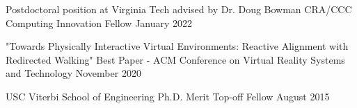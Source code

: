 
\begin{cventries}
  \cventry
    {Postdoctoral position at Virginia Tech advised by Dr. Doug Bowman} %
    {CRA/CCC Computing Innovation Fellow} %
    {January 2022} %
    {} %
    {}
    \vspace{-0.15in}
    
  \cventry
    {"Towards Physically Interactive Virtual Environments: Reactive Alignment with Redirected Walking"} %
    {Best Paper - ACM Conference on Virtual Reality Systems and Technology} %
    {November 2020} %
    {} %
    {}
    \vspace{-0.15in}
    
  \cventry
    {USC Viterbi School of Engineering} %
    {Ph.D. Merit Top-off Fellow} %
    {August 2015} %
    {} %
    {}
    \vspace{-0.15in}
\end{cventries}
